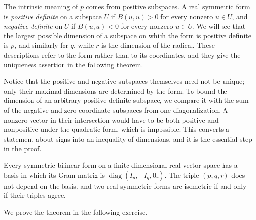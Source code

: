 \documentclass[12pt,reqno]{amsart}
\DeclareMathOperator{\diag}{diag}
\begin{document}
The intrinsic meaning of $p$ comes from positive subspaces. A real symmetric form is \emph{positive definite} on a subspace $U$ if $B(u,u)>0$ for every nonzero $u\in U$, and \emph{negative definite} on $U$ if $B(u,u)<0$ for every nonzero $u\in U$. We will see that the largest possible dimension of a subspace on which the form is positive definite is $p$, and similarly for $q$, while $r$ is the dimension of the radical. These descriptions refer to the form rather than to its coordinates, and they give the uniqueness assertion in the following theorem.

Notice that the positive and negative subspaces themselves need not be unique; only their maximal dimensions are determined by the form. To bound the dimension of an arbitrary positive definite subspace, we compare it with the sum of the negative and zero coordinate subspaces from one diagonalization. A nonzero vector in their intersection would have to be both positive and nonpositive under the quadratic form, which is impossible. This converts a statement about signs into an inequality of dimensions, and it is the essential step in the proof.

\begin{theorem}
Every symmetric bilinear form on a finite-dimensional real vector space has a basis in which its Gram matrix is $\diag(I_p,-I_q,0_r)$. The triple $(p,q,r)$ does not depend on the basis, and two real symmetric forms are isometric if and only if their triples agree.
\end{theorem}

We prove the theorem in the following exercise.

\hrulefill
\end{document}
